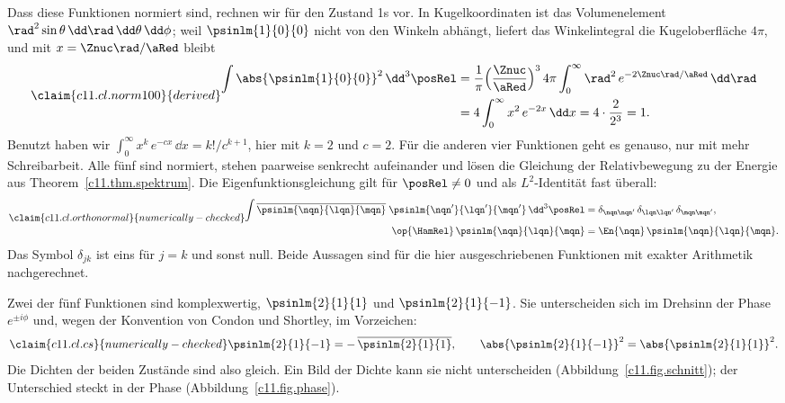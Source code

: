 Dass diese Funktionen normiert sind, rechnen wir für den Zustand 1s vor. In
Kugelkoordinaten ist das Volumenelement $\rad^2\sin\theta\,\dd\rad\,\dd\theta\,\dd\phi$;
weil $\psinlm{1}{0}{0}$ nicht von den Winkeln abhängt, liefert das Winkelintegral die
Kugeloberfläche $4\pi$, und mit $x = \Znuc\rad/\aRed$ bleibt
\begin{equation}\label{c11.eq.norm100}\claim{c11.cl.norm100}{derived}
  \begin{aligned}
    \int \abs{\psinlm{1}{0}{0}}^2\,\dd^3\posRel
    &= \frac{1}{\pi}\Bigl(\frac{\Znuc}{\aRed}\Bigr)^{3}\,4\pi
      \int_0^\infty \rad^2\,e^{-2\Znuc\rad/\aRed}\,\dd\rad \\
    &= 4\int_0^\infty x^2\,e^{-2x}\,\dd x
     = 4 \cdot \frac{2}{2^3} = 1 .
  \end{aligned}
\end{equation}
Benutzt haben wir $\int_0^\infty x^k\,e^{-cx}\,\dd x = k!/c^{k + 1}$, hier mit $k = 2$
und $c = 2$. Für die anderen vier Funktionen geht es genauso, nur mit mehr Schreibarbeit.
Alle fünf sind normiert, stehen paarweise senkrecht aufeinander und lösen die Gleichung
der Relativbewegung zu der Energie aus Theorem~\ref{c11.thm.spektrum}. Die
Eigenfunktionsgleichung gilt für $\posRel \neq 0$ und als $L^2$-Identität fast überall:
\begin{equation}\label{c11.eq.orthonormal}\claim{c11.cl.orthonormal}{numerically-checked}
  \begin{aligned}
    \int \overline{\psinlm{\nqn}{\lqn}{\mqn}}\;\psinlm{\nqn'}{\lqn'}{\mqn'}\,\dd^3\posRel
    &= \delta_{\nqn\nqn'}\,\delta_{\lqn\lqn'}\,\delta_{\mqn\mqn'}, \\
    \op{\HamRel}\,\psinlm{\nqn}{\lqn}{\mqn} &= \En{\nqn}\,\psinlm{\nqn}{\lqn}{\mqn}.
  \end{aligned}
\end{equation}
Das Symbol $\delta_{jk}$ ist eins für $j = k$ und sonst null. Beide Aussagen sind für
die hier ausgeschriebenen Funktionen mit exakter Arithmetik nachgerechnet.

Zwei der fünf Funktionen sind komplexwertig, $\psinlm{2}{1}{1}$ und $\psinlm{2}{1}{-1}$.
Sie unterscheiden sich im Drehsinn der Phase $e^{\pm i\phi}$ und, wegen der Konvention
von Condon und Shortley, im Vorzeichen:
\begin{equation}\label{c11.eq.cs}\claim{c11.cl.cs}{numerically-checked}
  \psinlm{2}{1}{-1} = -\,\overline{\psinlm{2}{1}{1}},
  \qquad
  \abs{\psinlm{2}{1}{-1}}^2 = \abs{\psinlm{2}{1}{1}}^2 .
\end{equation}
Die Dichten der beiden Zustände sind also gleich. Ein Bild der Dichte kann sie nicht
unterscheiden (Abbildung~\ref{c11.fig.schnitt}); der Unterschied steckt in der Phase
(Abbildung~\ref{c11.fig.phase}).

